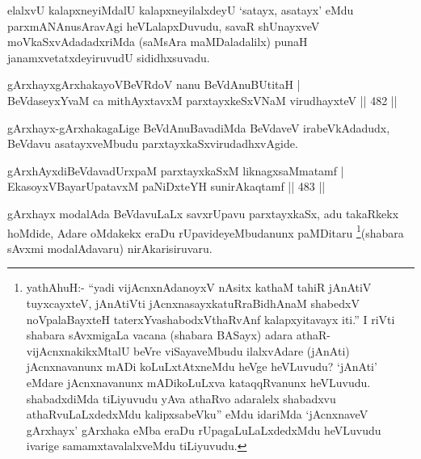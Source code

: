 \begin{artha}
elalxvU kalapxneyiMdalU kalapxneyilalxdeyU `satayx, asatayx' eMdu parxmANAnusAravAgi heVLalapxDuvudu, savaR shUnayxveV moVkaSxvAdadadxriMda (saMsAra maMDaladalilx) punaH janamxvetatxdeyiruvudU sididhxsuvadu.
\end{artha}


\begin{shl}
gArxhayxgArxhakayoVBeVRdoV nanu BeVdAnuBUtitaH | \\
BeVdaseyxYvaM ca mithAyxtavxM parxtayxkeSxVNaM virudhayxteV \hfill||  482 ||  
\end{shl}

\begin{artha}
gArxhayx-gArxhakagaLige BeVdAnuBavadiMda BeVdaveV irabeVkAdadudx, BeVdavu asatayxveMbudu parxtayxkaSxvirudadhxvAgide.
\end{artha}

\begin{shl}
gArxhAyxdiBeVdavadUrxpaM parxtayxkaSxM liknagxsaMmatamf | \\
EkasoyxVBayarUpatavxM paNiDxteYH sunirAkaqtamf \hfill||  483 ||  
\end{shl}

\begin{artha}
gArxhayx modalAda BeVdavuLaLx savxrUpavu parxtayxkaSx, adu takaRkekx hoMdide, Adare oMdakekx eraDu rUpavideyeMbudanunx paMDitaru \footnote[1]{yathAhuH:- ``yadi vijAcnxnAdanoyxV nAsitx kathaM tahiR jAnAtiV tuyxcayxteV, jAnAtiVti jAcnxnasayxkatuRraBidhAnaM shabedxV noVpalaBayxteH taterxYvashabodxV\s thaRvAnf kalapxyitavayx iti.'' I riVti shabara sAvxmigaLa vacana (shabara BASayx) adara athaR- vijAcnxnakikxMtalU beVre viSayaveMbudu ilalxvAdare (jAnAti) jAcnxnavanunx mADi koLuLxtAtxneMdu heVge heVLuvudu? `jAnAti' eMdare jAcnxnavanunx mADikoLuLxva kataqqRvanunx heVLuvudu. shabadxdiMda tiLiyuvudu yAva athaRvo adaralelx shabadxvu athaRvuLaLxdedxMdu kalipxsabeVku'' eMdu idariMda `jAcnxnaveV gArxhayx' gArxhaka eMba eraDu rUpagaLuLaLxdedxMdu heVLuvudu ivarige samamxtavalalxveMdu tiLiyuvudu.}(shabara sAvxmi modalAdavaru) nirAkarisiruvaru.
\end{artha}


